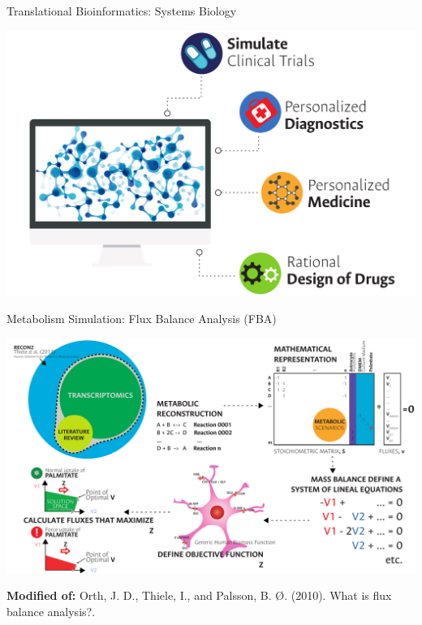 \documentclass[11pt]{beamer}
\begin{document}
\begin{frame}{Translational Bioinformatics: Systems Biology}
\begin{center}
\includegraphics[width=\textwidth]{TMedicine}
\end{center}
\end{frame}
\begin{frame}{Metabolism Simulation: Flux Balance Analysis (FBA)}
\begin{center}
\includegraphics[width=\textwidth]{FBA}
\end{center}
{\scriptsize \textbf{Modified  of:} Orth, J. D., Thiele, I., and  Palsson, B. Ø. (2010). What is flux balance analysis?.\\}
\end{frame}
\end{document}
